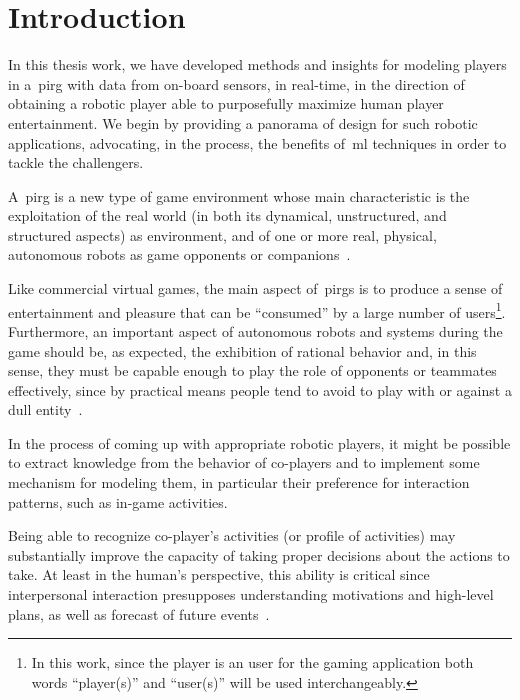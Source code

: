 \chapter{Introduction}

In this thesis work, we have developed methods and insights for modeling players in a~\acrfull{pirg} with data from on-board sensors, in real-time, in the direction of obtaining a robotic player able to purposefully maximize human player entertainment. We begin by providing a panorama of design for such robotic applications, advocating, in the process, the benefits of~\gls{ml} techniques in order to tackle the challengers.

A~\gls{pirg} is a new type of game environment whose main characteristic is the exploitation of the real world (in both its dynamical, unstructured, and structured aspects) as environment, and of one or more real, physical, autonomous robots as game opponents or companions~\citep{martinoia_physically_2013}.

Like commercial virtual games, the main aspect of~\glspl{pirg} is to produce a sense of entertainment and pleasure that can be ``consumed'' by a large number of users\footnote{In this work, since the player is an user for the gaming application both words ``player(s)'' and ``user(s)'' will be used interchangeably.}. Furthermore, an important aspect of autonomous robots and systems during the game should be, as expected, the exhibition of rational behavior and, in this sense, they must be capable enough to play the role of opponents or teammates effectively, since by practical means people tend to avoid to play with or against a dull entity~\citep{martinoia_physically_2013}.

In the process of coming up with appropriate robotic players, it might be possible to extract knowledge from the behavior of co-players and to implement some mechanism for modeling them, in particular their preference for interaction patterns, such as in-game activities. 

Being able to recognize co-player's activities (or profile of activities) may substantially improve the capacity of taking proper decisions about the actions to take. At least in the human's perspective, this ability is critical since interpersonal interaction presupposes understanding motivations and high-level plans, as well as forecast of future events~\citep{sukthankar_plan_2014}.

